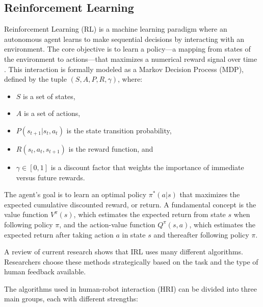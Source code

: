 \documentclass[rnd]{mas_proposal}
\begin{document}
\subsection{Reinforcement Learning}
Reinforcement Learning (RL) is a machine learning paradigm where an autonomous agent learns to make sequential decisions by interacting with an environment. The core objective is to learn a policy—a mapping from states of the environment to actions—that maximizes a numerical reward signal over time \citep{Lin2020}. This interaction is formally modeled as a Markov Decision Process (MDP), defined by the tuple $(S, A, P, R, \gamma)$, where:

\begin{itemize}
    \item $S$ is a set of states,
    \item $A$ is a set of actions,
    \item $P(s_{t+1} | s_t, a_t)$ is the state transition probability,
    \item $R(s_t, a_t, s_{t+1})$ is the reward function, and
    \item $\gamma \in [0, 1]$ is a discount factor that weights the importance of immediate versus future rewards.
\end{itemize}

The agent's goal is to learn an optimal policy $\pi^*(a|s)$ that maximizes the expected cumulative discounted reward, or return. A fundamental concept is the value function $V^{\pi}(s)$, which estimates the expected return from state $s$ when following policy $\pi$, and the action-value function $Q^{\pi}(s, a)$, which estimates the expected return after taking action $a$ in state $s$ and thereafter following policy $\pi$.

A review of current research shows that IRL uses many different algorithms. Researchers choose these methods strategically based on the task and the type of human feedback available.

The algorithms used in human-robot interaction (HRI) can be divided into three main groups, each with different strengths:
\end{document}
